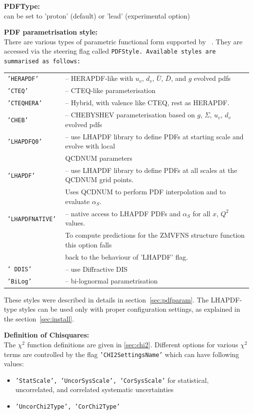 \begin{description}
\begin{description}
\item {\bf PDFType:} \\
can be set to 'proton' (default) or 'lead' (experimental option)

\item {\bf PDF parametrisation style:}\\
There are various types of parametric functional form supported by \fitter\ .
They are accessed via the steering flag called \tt{PDFStyle}\rm. Available styles
are summarised as follows:

\begin{tabular}{ll}
 \tt  'HERAPDF'   & -- HERAPDF-like with  $u_v$, $d_v$, $\bar{U}$, $\bar{D}$, and $g$ evolved pdfs \\
 \tt   'CTEQ'      & -- CTEQ-like parameterisation  \\
 \tt  'CTEQHERA'   & -- Hybrid, with valence like CTEQ, rest as HERAPDF.\\
 \tt   'CHEB'       & -- CHEBYSHEV parameterisation based on $g$, $\Sigma$, $u_v$, $d_v$ evolved pdfs \\
 \tt  'LHAPDFQ0'    & -- use LHAPDF library to define PDFs at starting scale and evolve with local \\
                    &  QCDNUM parameters \\
 \tt  'LHAPDF'      & -- use LHAPDF library to define PDFs at all scales at the QCDNUM grid points. \\
                    &    Uses QCDNUM to perform PDF interpolation and to evaluate $\alpha_S$. \\
 \tt  'LHAPDFNATIVE' & -- native access to LHAPDF PDFs and $\alpha_S$ for all $x$, $Q^2$ values.  \\ 
                    & To compute predictions for the ZMVFNS structure function this option falls \\
                    &  back to the behaviour of 'LHAPDF' flag.\\
 \tt   ' DDIS'        & -- use Diffractive DIS \\
 \tt  'BiLog'       & -- bi-lognormal parametrisation \\
\end{tabular}


These styles were described in details in section~\ref{sec:pdfparam}.
The LHAPDF-type styles can be used only with proper configuration settings,
 as explained in the section~\ref{sec:install}.
\item {\bf  Definition of Chisquares:}\\
The $\chi^2$ function definitions are given in \ref{sec:chi2}.
Different  options for various $\chi^2$ terms are controlled by the flag {\tt 'CHI2SettingsName'}
which can have following values: 
\begin{itemize}
\item {\tt 'StatScale', 'UncorSysScale', 'CorSysScale'} for statistical, uncorrelated, and correlated
systematic uncertainties
\item {\tt 'UncorChi2Type', 'CorChi2Type'}
\end{itemize}



\end{description}
\end{description}
